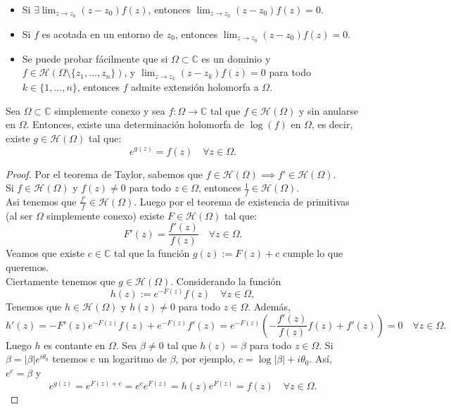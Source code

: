 \begin{observación}
    \vspace{-2em}
    \begin{itemize}
        \item Si $\exists \lim_{z \to z_0} (z - z_0) f(z)$, entonces $\lim_{z \to z_0} (z - z_0) f(z) = 0$.
        \item Si $f$ es acotada en un entorno de $z_0$, entonces $\lim_{z \to z_0} (z - z_0) f(z) = 0$.
        \item Se puede probar fácilmente que si $\Omega \subset \mathbb{C}$ es un dominio y $f \in \mathcal{H}(\Omega \setminus \{z_1, \ldots, z_n \})$, y $\lim_{z \to z_k} (z - z_k) f(z) = 0$ para todo $k \in \{1, \ldots, n\}$, entonces $f$ admite extensión holomorfa a $\Omega$.
    \end{itemize}
\end{observación}

\begin{proposición}
    Sea $\Omega \subset \mathbb{C}$ simplemente conexo y sea $f : \Omega \to \mathbb{C}$ tal que $f \in \mathcal{H}(\Omega)$ y sin anularse en $\Omega$. Entonces, existe una determinación holomorfa de $\log(f)$ en $\Omega$, es decir, existe $g \in \mathcal{H}(\Omega)$ tal que:
    \[
        e^{g(z)} = f(z) \quad \forall z \in \Omega.
    \]
\end{proposición}

\begin{proof}
    Por el teorema de Taylor, sabemos que $f \in \mathcal{H}(\Omega) \implies f' \in \mathcal{H}(\Omega)$.\\
    Si $f \in \mathcal{H}(\Omega)$ y $f(z) \neq 0$ para todo $z \in \Omega$, entonces $\frac{1}{f} \in \mathcal{H}(\Omega)$.\\
    Asi tenemos que $\frac{f'}{f} \in \mathcal{H}(\Omega)$. Luego por el teorema de existencia de primitivas (al ser $\Omega$ simplemente conexo) existe $F \in \mathcal{H}(\Omega)$ tal que:
    \[
        F'(z) = \frac{f'(z)}{f(z)} \quad \forall z \in \Omega.
    \]
    Veamos que existe $c \in \mathbb{C}$ tal que la función $g(z) := F(z) + c$ cumple lo que queremos.\\
    Ciertamente tenemos que $g \in \mathcal{H}(\Omega)$. Considerando la función
    \[
        h(z) := e^{-F(z)} f(z) \quad \forall z \in \Omega,
    \]
    Tenemos que $h \in \mathcal{H}(\Omega)$ y $h(z) \neq 0$ para todo $z \in \Omega$. Además,
    \[
        h'(z) = -F'(z) e^{-F(z)} f(z) + e^{-F(z)} f'(z) = e^{-F(z)} \left( -\frac{f'(z)}{f(z)} f(z) + f'(z) \right) = 0 \quad \forall z \in \Omega.
    \]
    Luego $h$ es contante en $\Omega$. Sea $\beta \neq 0$ tal que $h(z) = \beta$ para todo $z \in \Omega$. 
    Si $\beta = |\beta|e^{i\theta_0}$ tenemos c un logaritmo de $\beta$, por ejemplo, $c = \log{|\beta|} + i \theta_0$. Así, $e^c = \beta$ y
    \[
        e^{g(z)} = e^{F(z) + c} = e^c e^{F(z)} = h(z) e^{F(z)} = f(z) \quad \forall z \in \Omega. 
    \]
\end{proof}

